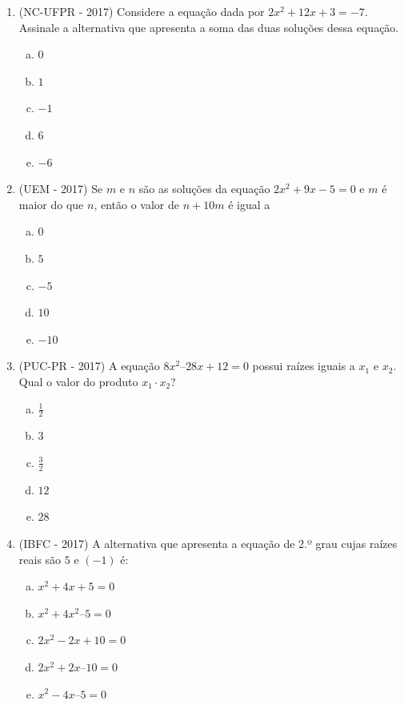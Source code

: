 \begin{enumerate}
 \item (NC-UFPR - 2017) Considere a equação dada por $2x^2 + 12x + 3 = -7$. Assinale a alternativa que apresenta a soma das duas soluções dessa equação.
 \begin{multicols}{5}
 \begin{enumerate}[a)]
 \item $0$
 \item $1$
 \item $-1$
 \item $6$
 \item $-6$
 \end{enumerate}
 \end{multicols}

 \item (UEM - 2017) Se $m$ e $n$ são as soluções da equação  $2x^2 +9x - 5 = 0$  e $m$ é maior do que $n$, então o valor de $n +10m$ é igual a
 \begin{multicols}{5}
 \begin{enumerate}[a)]
 \item $0$
 \item $5$
 \item $-5$
 \item $10$
 \item $-10$
 \end{enumerate}
 \end{multicols}

 \item (PUC-PR - 2017) A equação $8x^2 – 28x + 12 = 0$ possui raízes iguais a $x_1$ e $x_2$. Qual o valor do produto $x_1 \cdot x_2$?
 \begin{multicols}{5}
 \begin{enumerate}[a)]
 \item $\frac{1}{2}$
 \item $3$
 \item $\frac{3}{2}$
 \item $12$
 \item $28$
 \end{enumerate}
 \end{multicols}

 \item (IBFC - 2017) A alternativa que apresenta a equação de 2.º grau cujas raízes reais são $5$ e $(-1)$ é:
 \begin{enumerate}[a)]
 \item $x^2 + 4x + 5 = 0$
 \item $x^2 + 4x^2 – 5 = 0$
 \item $2x^2 - 2x + 10 = 0$
 \item $2x^2 + 2x – 10 = 0$
 \item $x^2 - 4x – 5 = 0$
 \end{enumerate}


\end{enumerate}
